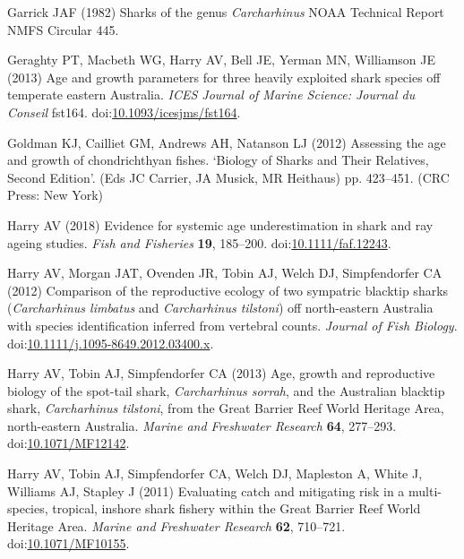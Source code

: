 \documentclass[]{article}
\begin{document}
\hypertarget{ref-garrick_sharks_1982}{}
Garrick JAF (1982) Sharks of the genus \emph{Carcharhinus} NOAA
Technical Report NMFS Circular 445.

\hypertarget{ref-geraghty_age_2013}{}
Geraghty PT, Macbeth WG, Harry AV, Bell JE, Yerman MN, Williamson JE
(2013) Age and growth parameters for three heavily exploited shark
species off temperate eastern Australia. \emph{ICES Journal of Marine
Science: Journal du Conseil} fst164.
doi:\href{https://doi.org/10.1093/icesjms/fst164}{10.1093/icesjms/fst164}.

\hypertarget{ref-goldman_assessing_2012}{}
Goldman KJ, Cailliet GM, Andrews AH, Natanson LJ (2012) Assessing the
age and growth of chondrichthyan fishes. `Biology of Sharks and Their
Relatives, Second Edition'. (Eds JC Carrier, JA Musick, MR Heithaus) pp.
423--451. (CRC Press: New York)

\hypertarget{ref-harry_evidence_2018}{}
Harry AV (2018) Evidence for systemic age underestimation in shark and
ray ageing studies. \emph{Fish and Fisheries} \textbf{19}, 185--200.
doi:\href{https://doi.org/10.1111/faf.12243}{10.1111/faf.12243}.

\hypertarget{ref-harry_comparison_2012}{}
Harry AV, Morgan JAT, Ovenden JR, Tobin AJ, Welch DJ, Simpfendorfer CA
(2012) Comparison of the reproductive ecology of two sympatric blacktip
sharks (\emph{Carcharhinus limbatus} and \emph{Carcharhinus tilstoni})
off north-eastern Australia with species identification inferred from
vertebral counts. \emph{Journal of Fish Biology}.
doi:\href{https://doi.org/10.1111/j.1095-8649.2012.03400.x}{10.1111/j.1095-8649.2012.03400.x}.

\hypertarget{ref-harry_age_2013}{}
Harry AV, Tobin AJ, Simpfendorfer CA (2013) Age, growth and reproductive
biology of the spot-tail shark, \emph{Carcharhinus sorrah}, and the
Australian blacktip shark, \emph{Carcharhinus tilstoni}, from the Great
Barrier Reef World Heritage Area, north-eastern Australia. \emph{Marine
and Freshwater Research} \textbf{64}, 277--293.
doi:\href{https://doi.org/10.1071/MF12142}{10.1071/MF12142}.

\hypertarget{ref-harry_evaluating_2011}{}
Harry AV, Tobin AJ, Simpfendorfer CA, Welch DJ, Mapleston A, White J,
Williams AJ, Stapley J (2011) Evaluating catch and mitigating risk in a
multi-species, tropical, inshore shark fishery within the Great Barrier
Reef World Heritage Area. \emph{Marine and Freshwater Research}
\textbf{62}, 710--721.
doi:\href{https://doi.org/10.1071/MF10155}{10.1071/MF10155}.
\end{document}
